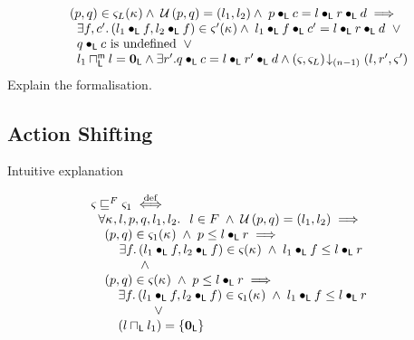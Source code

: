 \begin{definition}
\[\begin{array}{l}
  \hspace*{0.2cm} (p, q) \in \varsigma_{L}(\kappa_{})
  \land\; \mathcal{U}\left(p, q\right) = (l_1, l_2)
  \land\; p \bullet_{\textsf{L}} c = l \bullet_{\textsf{L}} r \bullet_{\textsf{L}} d \implies\\
  
  \hspace*{0.4cm}\exists f, c'.\, (l_1 \bullet_{\textsf{L}} f, l_2 \bullet_{\textsf{L}} f) \in \varsigma_{}'(\kappa_{}) \land\; l_1 \bullet_{\textsf{L}} f \bullet_{\textsf{L}} c' =  l \bullet_{\textsf{L}} r \bullet_{\textsf{L}} d \;\;\lor\\
	

		\hspace*{0.4cm}q \bullet_{\textsf{L}} c \text{ is undefined} \;\;\lor\\
		\hspace*{0.4cm}l_1 \sqcap_{\textsf{L}}^{\textsf{m}} l = \mathbf{0}_{\textsf{L}} \land \exists r'.\,\! q \bullet_{\textsf{L}} c = l \bullet_{\textsf{L}} r' \bullet_{\textsf{L}} d \land \left(\varsigma_{}, \varsigma_{L}\right) \!\downarrow_{(n-1)} \left(l, r', \varsigma_{}'\right)

\end{array}
\]
%
\todo Explain the formalisation.
\end{definition}
%
%
%
%
\subsection{Action Shifting}
\todo Intuitive explanation
\begin{definition}
%
\[
\begin{array}{l}
	\varsigma_{} \sqsubseteq^{F}  \varsigma_{1} \stackrel{\mathrm{def}}{\iff} \\
	\hspace*{0.2cm}\forall \kappa_{}, l, p, q, l_1, l_2.\,\;\; l \in F \;\land\; \mathcal{U}\left(p, q\right) = (l_1, l_2) \implies\\
	\hspace*{0.2cm}
	\begin{array}{l}
		(p, q) \in \varsigma_{1}(\kappa_{}) 
		\;\land\; p \leq l \bullet_{\textsf{L}} r \implies \\
		\hspace*{0.4cm}\exists f.\, (l_1 \bullet_{\textsf{L}} f, l_2 \bullet_{\textsf{L}} f) \in \varsigma_{}(\kappa_{}) \;\land\; l_1 \bullet_{\textsf{L}} f \leq l \bullet_{\textsf{L}} r \\

		\hspace*{1cm} \land\\
		
		(p, q) \in \varsigma_{}(\kappa_{})
		\;\land\; p \leq l \bullet_{\textsf{L}} r \implies \\
		\hspace*{0.2cm}
		\begin{array}{l}
			\exists f.\, (l_1 \bullet_{\textsf{L}} f, l_2 \bullet_{\textsf{L}} f) \in \varsigma_{1}(\kappa_{}) \;\land\; l_1 \bullet_{\textsf{L}} f \leq l \bullet_{\textsf{L}} r \\
			\hspace*{1cm} \lor\\
			\left( l \sqcap_{\textsf{L}} l_1 \right) = \left\{ \mathbf{0}_{\textsf{L}} \right\}
		\end{array}

	\end{array}
\end{array}
\]
%
\end{definition}
